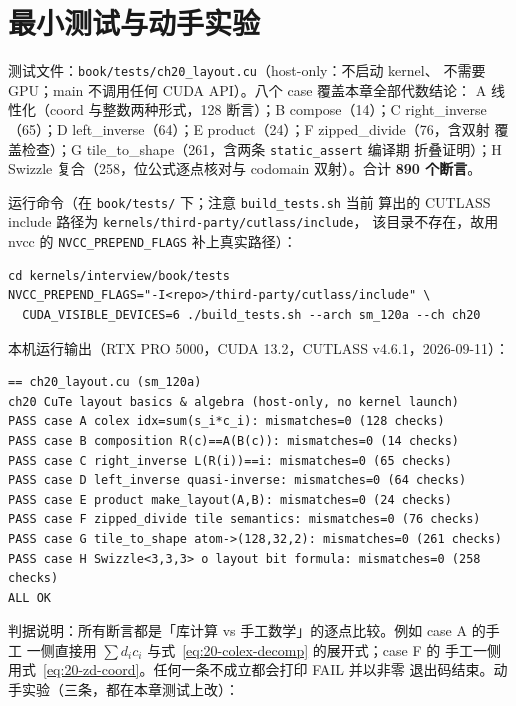 \section{最小测试与动手实验}

测试文件：\texttt{book/\allowbreak{}tests/\allowbreak{}ch20\_\allowbreak{}layout.\allowbreak{}cu}（host-only：不启动 kernel、
不需要 GPU；main 不调用任何 CUDA API）。八个 case 覆盖本章全部代数结论：
A 线性化（coord 与整数两种形式，128 断言）；B compose（14）；C right\_inverse
（65）；D left\_inverse（64）；E product（24）；F zipped\_divide（76，含双射
覆盖检查）；G tile\_to\_shape（261，含两条 \texttt{static\_\allowbreak{}assert} 编译期
折叠证明）；H Swizzle 复合（258，位公式逐点核对与 codomain 双射）。合计
\textbf{890 个断言}。

运行命令（在 \texttt{book/tests/} 下；注意 \texttt{build\_\allowbreak{}tests.\allowbreak{}sh} 当前
算出的 CUTLASS include 路径为
\texttt{kernels/}\allowbreak\texttt{third-party/\allowbreak{}}\allowbreak\texttt{cutlass/\allowbreak{}include}，
该目录不存在，故用 nvcc 的 \texttt{NVCC\_\allowbreak{}PREPEND\_\allowbreak{}FLAGS} 补上真实路径）：

\begin{lstlisting}[style=console]
cd kernels/interview/book/tests
NVCC_PREPEND_FLAGS="-I<repo>/third-party/cutlass/include" \
  CUDA_VISIBLE_DEVICES=6 ./build_tests.sh --arch sm_120a --ch ch20
\end{lstlisting}

本机运行输出（RTX PRO 5000，CUDA 13.2，CUTLASS v4.6.1，2026-09-11）：

\begin{lstlisting}[style=console]
== ch20_layout.cu (sm_120a)
ch20 CuTe layout basics & algebra (host-only, no kernel launch)
PASS case A colex idx=sum(s_i*c_i): mismatches=0 (128 checks)
PASS case B composition R(c)==A(B(c)): mismatches=0 (14 checks)
PASS case C right_inverse L(R(i))==i: mismatches=0 (65 checks)
PASS case D left_inverse quasi-inverse: mismatches=0 (64 checks)
PASS case E product make_layout(A,B): mismatches=0 (24 checks)
PASS case F zipped_divide tile semantics: mismatches=0 (76 checks)
PASS case G tile_to_shape atom->(128,32,2): mismatches=0 (261 checks)
PASS case H Swizzle<3,3,3> o layout bit formula: mismatches=0 (258 checks)
ALL OK
\end{lstlisting}

判据说明：所有断言都是「库计算 vs 手工数学」的逐点比较。例如 case A 的手工
一侧直接用 $\sum d_i c_i$ 与式~\eqref{eq:20-colex-decomp} 的展开式；case F 的
手工一侧用式~\eqref{eq:20-zd-coord}。任何一条不成立都会打印 FAIL 并以非零
退出码结束。动手实验（三条，都在本章测试上改）：

